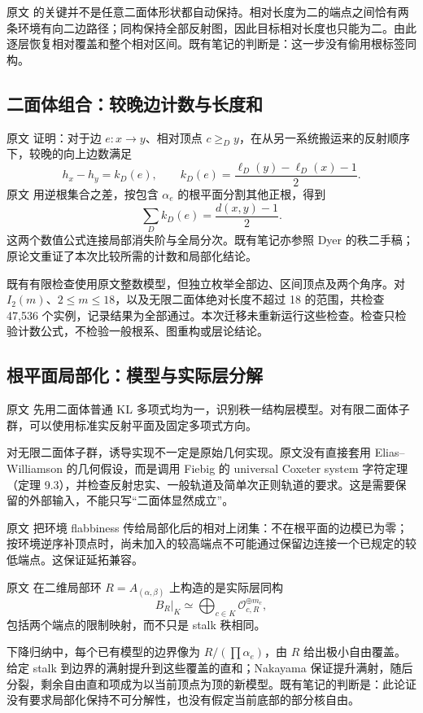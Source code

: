 原文  的关键并不是任意二面体形状都自动保持。相对长度为二的端点之间恰有两条环境有向二边路径；同构保持全部反射图，因此目标相对长度也只能为二。由此逐层恢复相对覆盖和整个相对区间。既有笔记的判断是：这一步没有偷用根标签同构。

\subsection{二面体组合：较晚边计数与长度和}\label{audit:counts}
原文  证明：对于边 \(e:x\to y\)、相对顶点 \(c\ge_D y\)，在从另一系统搬运来的反射顺序下，较晚的向上边数满足
\[
h_x-h_y=k_D(e),\qquad
k_D(e)=\frac{\ell_D(y)-\ell_D(x)-1}{2}.
\]
原文  用逆根集合之差，按包含 \(\alpha_e\) 的根平面分割其他正根，得到
\[
\sum_D k_D(e)=\frac{d(x,y)-1}{2}.
\]
这两个数值公式连接局部消失阶与全局分次。既有笔记亦参照 Dyer 的秩二手稿\cite{DyerRankTwo}；原论文重证了本次比较所需的计数和局部化结论。

既有有限检查使用原文整数模型，但独立枚举全部边、区间顶点及两个角序。对 \(I_2(m)\)、\(2\le m\le18\)，以及无限二面体绝对长度不超过 18 的范围，共检查 47,536 个实例，记录结果为全部通过。本次迁移未重新运行这些检查。检查只检验计数公式，不检验一般根系、图重构或层论结论。

\subsection{根平面局部化：模型与实际层分解}\label{audit:localization}
原文  先用二面体普通 KL 多项式均为一，识别秩一结构层模型。对有限二面体子群，可以使用标准实反射平面及固定多项式方向。

对无限二面体子群，诱导实现不一定是原始几何实现。原文没有直接套用 Elias--Williamson 的几何假设，而是调用 Fiebig\cite{Fiebig} 的 universal Coxeter system 字符定理（定理 9.3），并检查反射忠实、一般轨道及简单次正则轨道的要求。这是需要保留的外部输入，不能只写“二面体显然成立”。

原文  把环境 flabbiness 传给局部化后的相对上闭集：不在根平面的边模已为零；按环境逆序补顶点时，尚未加入的较高端点不可能通过保留边连接一个已规定的较低端点。这保证延拓兼容。

原文  在二维局部环 \(R=A_{(\alpha,\beta)}\) 上构造的是实际层同构
\[
B_R|_K\simeq\bigoplus_{c\in K}\mathcal O_{c,R}^{\oplus m_c},
\]
包括两个端点的限制映射，而不只是 stalk 秩相同。

下降归纳中，每个已有模型的边界像为
\(R/(\prod\alpha_e)\)，由 \(R\) 给出极小自由覆盖。给定 stalk 到边界的满射提升到这些覆盖的直和；Nakayama 保证提升满射，随后分裂，剩余自由直和项成为以当前顶点为顶的新模型。既有笔记的判断是：此论证没有要求局部化保持不可分解性，也没有假定当前底部的部分核自由。

